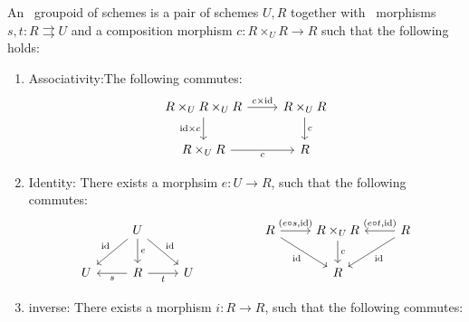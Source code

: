 \begin{definition}
	An \etale\ groupoid of schemes is a pair of schemes $U, R$ together with \etale\ morphisms $s,t: R \rightrightarrows U$ and a composition morphism $c: R\times_UR \to R$ such that the following holds:
	\begin{enumerate}
		\item Associativity:The following commutes:
		\[\begin{tikzcd}
			{R\times_UR\times_UR} & {R\times_UR} \\
			{R\times_UR} & R
			\arrow["{c\times\mathrm{id}}", from=1-1, to=1-2]
			\arrow["{\mathrm{id}\times c}"', from=1-1, to=2-1]
			\arrow["c", from=1-2, to=2-2]
			\arrow["c"', from=2-1, to=2-2]
		\end{tikzcd}\]
		\item Identity: There exists a morphsim $e:U\to R$, such that the following commutes:
		\[\begin{tikzcd}
			& U &&& R & {R\times_UR} & R \\
			U & R & U &&& R
			\arrow["{\mathrm{id}}"', from=1-2, to=2-1]
			\arrow["e", from=1-2, to=2-2]
			\arrow["{\mathrm{id}}", from=1-2, to=2-3]
			\arrow["{(e\circ s, \mathrm{id})}", from=1-5, to=1-6]
			\arrow["{\mathrm{id}}"', from=1-5, to=2-6]
			\arrow["c", from=1-6, to=2-6]
			\arrow["{(e\circ t, \mathrm{id})}"', from=1-7, to=1-6]
			\arrow["{\mathrm{id}}", from=1-7, to=2-6]
			\arrow["s", from=2-2, to=2-1]
			\arrow["t"', from=2-2, to=2-3]
		\end{tikzcd}\]
		\item inverse: There exists a morphism $i: R\to R$, such that the following commutes:

\end{enumerate}
\end{definition}
